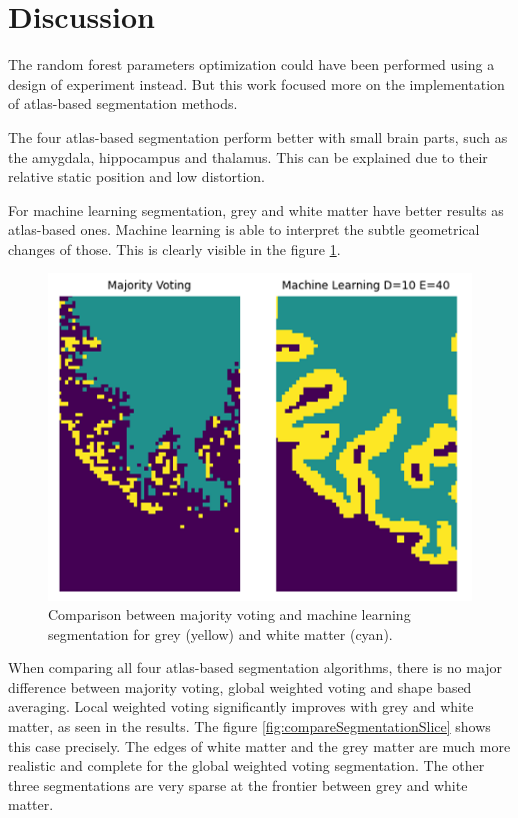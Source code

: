 \section*{Discussion}
The random forest parameters optimization could have been performed using a design of experiment instead. But this work focused more on the implementation of atlas-based segmentation methods.

The four atlas-based segmentation perform better with small brain parts, such as the amygdala, hippocampus and thalamus. This can be explained due to their relative static position and low distortion. 

For machine learning segmentation, grey and white matter have better results as atlas-based ones. Machine learning is able to interpret the subtle geometrical changes of those. This is clearly visible in the figure \ref{fig:compareGreyMatter}.

\begin{figure}[h!]
	\centering
	\includegraphics[width=\linewidth]{img/compareGreyMatter}
	\caption{Comparison between majority voting and machine learning segmentation for grey (yellow) and white matter (cyan).}
	\label{fig:compareGreyMatter}
\end{figure}

When comparing all four atlas-based segmentation algorithms, there is no major difference between majority voting, global weighted voting and shape based averaging. Local weighted voting significantly improves with grey and white matter, as seen in the results. The figure \ref{fig:compareSegmentationSlice} shows this case precisely. The edges of white matter and the grey matter are much more realistic and complete for the global weighted voting segmentation. The other three segmentations are very sparse at the frontier between grey and white matter.

